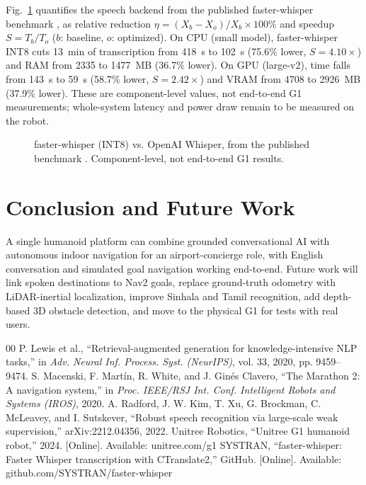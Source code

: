 \documentclass[conference]{IEEEtran}
\begin{document}
Fig.~\ref{fig:benchmark} quantifies the speech backend from the published faster-whisper benchmark \cite{systran_fasterwhisper}, as relative reduction $\eta = (X_b - X_o)/X_b \times 100\%$ and speedup $S = T_b/T_o$ ($b$: baseline, $o$: optimized). On CPU (small model), faster-whisper INT8 cuts 13~min of transcription from 418~s to 102~s (75.6\% lower, $S = 4.10\times$) and RAM from 2335 to 1477~MB (36.7\% lower). On GPU (large-v2), time falls from 143~s to 59~s (58.7\% lower, $S = 2.42\times$) and VRAM from 4708 to 2926~MB (37.9\% lower). These are component-level values, not end-to-end G1 measurements; whole-system latency and power draw remain to be measured on the robot.

\begin{figure}[htbp]
\centering
\caption{faster-whisper (INT8) vs. OpenAI Whisper, from the published benchmark \cite{systran_fasterwhisper}. Component-level, not end-to-end G1 results.}
\label{fig:benchmark}
\end{figure}

\section{Conclusion and Future Work}
A single humanoid platform can combine grounded conversational AI with autonomous indoor navigation for an airport-concierge role, with English conversation and simulated goal navigation working end-to-end. Future work will link spoken destinations to Nav2 goals, replace ground-truth odometry with LiDAR-inertial localization, improve Sinhala and Tamil recognition, add depth-based 3D obstacle detection, and move to the physical G1 for tests with real users.

\begin{thebibliography}{00}
 P. Lewis et al., ``Retrieval-augmented generation for knowledge-intensive NLP tasks,'' in \textit{Adv. Neural Inf. Process. Syst. (NeurIPS)}, vol. 33, 2020, pp. 9459--9474.
 S. Macenski, F. Mart\'in, R. White, and J. Gin\'es Clavero, ``The Marathon 2: A navigation system,'' in \textit{Proc. IEEE/RSJ Int. Conf. Intelligent Robots and Systems (IROS)}, 2020.
 A. Radford, J. W. Kim, T. Xu, G. Brockman, C. McLeavey, and I. Sutskever, ``Robust speech recognition via large-scale weak supervision,'' arXiv:2212.04356, 2022.
 Unitree Robotics, ``Unitree G1 humanoid robot,'' 2024. [Online]. Available: unitree.com/g1
 SYSTRAN, ``faster-whisper: Faster Whisper transcription with CTranslate2,'' GitHub. [Online]. Available: github.com/SYSTRAN/faster-whisper
\end{thebibliography}
\end{document}

